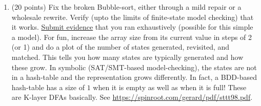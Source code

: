 \documentclass[11pt]{article}
\begin{document}
\begin{enumerate}
\begin{enumerate}
\begin{enumerate}
    \end{enumerate}
  \end{enumerate}




\begin{minipage}{\minpagw}
\end{minipage}

\clearpage


\item (20 points) Fix the broken Bubble-sort, either through
  a mild repair or a wholesale rewrite.
  Verify (upto the limits of finite-state model checking) that
  it works.
  \underline{Submit evidence} that you ran exhaustively (possible for this simple a model).
    For fun, increase the array size from its current value in steps of 2 (or 1) and do a plot
    of the number of states generated, revisited, and matched. This tells you how many
    states are typically generated and how these grow. In symbolic (SAT/SMT-based model-checking),
    the states are not in a hash-table and the representation grows differently. In fact, a
    BDD-based hash-table has a size of $1$ when it is empty as well as when it is full!
    These are K-layer DFAs basically. See \url{https://spinroot.com/gerard/pdf/sttt98.pdf}.
  
\begin{minipage}{\minpagw}
\end{minipage}
\end{enumerate}
\end{document}
